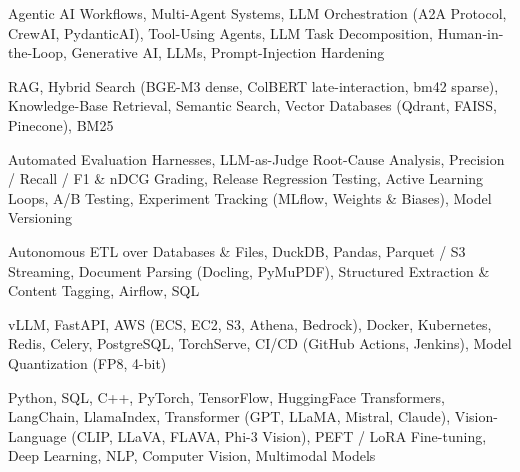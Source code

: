 \documentclass[letter,10pt]{article}
\begin{document}
 Agentic AI Workflows, Multi-Agent Systems, LLM Orchestration (A2A Protocol, CrewAI, PydanticAI), Tool-Using Agents, LLM Task Decomposition, Human-in-the-Loop, Generative AI, LLMs, Prompt-Injection Hardening\par\vspace{2pt}

 RAG, Hybrid Search (BGE-M3 dense, ColBERT late-interaction, bm42 sparse), Knowledge-Base Retrieval, Semantic Search, Vector Databases (Qdrant, FAISS, Pinecone), BM25\par\vspace{2pt}

 Automated Evaluation Harnesses, LLM-as-Judge Root-Cause Analysis, Precision / Recall / F1 \& nDCG Grading, Release Regression Testing, Active Learning Loops, A/B Testing, Experiment Tracking (MLflow, Weights \& Biases), Model Versioning\par\vspace{2pt}

 Autonomous ETL over Databases \& Files, DuckDB, Pandas, Parquet / S3 Streaming, Document Parsing (Docling, PyMuPDF), Structured Extraction \& Content Tagging, Airflow, SQL\par\vspace{2pt}

 vLLM, FastAPI, AWS (ECS, EC2, S3, Athena, Bedrock), Docker, Kubernetes, Redis, Celery, PostgreSQL, TorchServe, CI/CD (GitHub Actions, Jenkins), Model Quantization (FP8, 4-bit)\par\vspace{2pt}

 Python, SQL, C++, PyTorch, TensorFlow, HuggingFace Transformers, LangChain, LlamaIndex, Transformer (GPT, LLaMA, Mistral, Claude), Vision-Language (CLIP, LLaVA, FLAVA, Phi-3 Vision), PEFT / LoRA Fine-tuning, Deep Learning, NLP, Computer Vision, Multimodal Models
\end{document}
